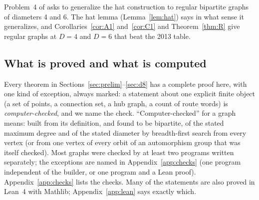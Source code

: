 \documentclass[11pt]{amsart}
\theoremstyle{definition}
\theoremstyle{remark}
\numberwithin{equation}{section}
\begin{document}
Problem~4 of \cite{AL20} asks to generalize the hat construction to regular bipartite graphs of diameters 4 and 6. The
hat lemma (Lemma~\ref{lem:hat}) says in what sense it generalizes, and Corollaries~\ref{cor:A1} and~\ref{cor:C1} and
Theorem~\ref{thm:R} give regular graphs at $D=4$ and $D=6$ that beat the 2013 table.

\subsection*{What is proved and what is computed}
Every theorem in Sections~\ref{sec:prelim}--\ref{sec:d8} has a complete proof here, with one kind of exception, always
marked: a statement about one explicit finite object (a set of points, a connection set, a hub graph, a count of
route words) is \emph{computer-checked}, and we name the check. ``Computer-checked'' for a graph means: built from its
definition, and found to be bipartite, of the stated maximum degree and of the stated diameter by breadth-first search
from every vertex (or from one vertex of every orbit of an automorphism group that was itself checked). Most graphs were
checked by at least two programs written separately; the exceptions are named in Appendix~\ref{app:checks} (one program
independent of the builder, or one program and a Lean proof). Appendix~\ref{app:checks} lists the checks. Many of the statements are also proved in
Lean~4 with Mathlib; Appendix~\ref{app:lean} says exactly which.
\end{document}
